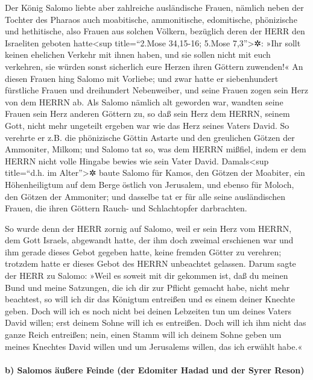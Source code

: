 Der König Salomo liebte aber zahlreiche ausländische
Frauen, nämlich neben der Tochter des Pharaos auch moabitische,
ammonitische, edomitische, phönizische und hethitische,
also Frauen aus solchen Völkern, bezüglich deren der HERR
den Israeliten geboten hatte\textless sup title=``2.Mose 34,15-16;
5.Mose 7,3''\textgreater✲: »Ihr sollt keinen ehelichen Verkehr mit ihnen
haben, und sie sollen nicht mit euch verkehren, sie würden sonst
sicherlich eure Herzen ihren Göttern zuwenden!« An diesen Frauen hing
Salomo mit Vorliebe; und zwar hatte er siebenhundert
fürstliche Frauen und dreihundert Nebenweiber, und seine Frauen zogen
sein Herz von dem HERRN ab. Als Salomo nämlich alt
geworden war, wandten seine Frauen sein Herz anderen Göttern zu, so daß
sein Herz dem HERRN, seinem Gott, nicht mehr ungeteilt ergeben war wie
das Herz seines Vaters David. So verehrte er z.B. die
phönizische Göttin Astarte und den greulichen Götzen der Ammoniter,
Milkom; und Salomo tat so, was dem HERRN mißfiel, indem er
dem HERRN nicht volle Hingabe bewies wie sein Vater David.
Damals\textless sup title=``d.h. im Alter''\textgreater✲
baute Salomo für Kamos, den Götzen der Moabiter, ein Höhenheiligtum auf
dem Berge östlich von Jerusalem, und ebenso für Moloch, den Götzen der
Ammoniter; und dasselbe tat er für alle seine
ausländischen Frauen, die ihren Göttern Rauch- und Schlachtopfer
darbrachten.

So wurde denn der HERR zornig auf Salomo, weil er sein
Herz vom HERRN, dem Gott Israels, abgewandt hatte, der ihm doch zweimal
erschienen war und ihm gerade dieses Gebot gegeben hatte,
keine fremden Götter zu verehren; trotzdem hatte er dieses Gebot des
HERRN unbeachtet gelassen. Darum sagte der HERR zu
Salomo: »Weil es soweit mit dir gekommen ist, daß du meinen Bund und
meine Satzungen, die ich dir zur Pflicht gemacht habe, nicht mehr
beachtest, so will ich dir das Königtum entreißen und es einem deiner
Knechte geben. Doch will ich es noch nicht bei deinen
Lebzeiten tun um deines Vaters David willen; erst deinem Sohne will ich
es entreißen. Doch will ich ihm nicht das ganze Reich
entreißen; nein, einen Stamm will ich deinem Sohne geben um meines
Knechtes David willen und um Jerusalems willen, das ich erwählt habe.«

\hypertarget{b-salomos-uxe4uuxdfere-feinde-der-edomiter-hadad-und-der-syrer-reson}{%
\paragraph{b) Salomos äußere Feinde (der Edomiter Hadad und der Syrer
Reson)}\label{b-salomos-uxe4uuxdfere-feinde-der-edomiter-hadad-und-der-syrer-reson}}

